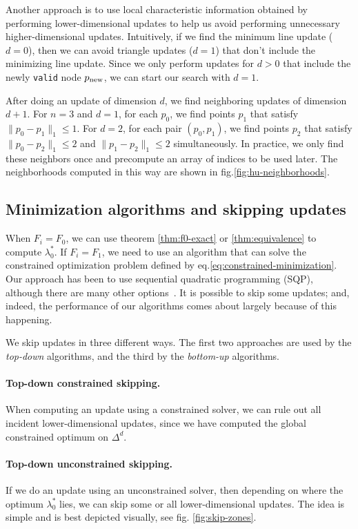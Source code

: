 \documentclass[smallcondensed]{svjour3}
\begin{document}
Another approach is to use local characteristic information obtained
by performing lower-dimensional updates to help us avoid performing
unnecessary higher-dimensional updates. Intuitively, if we find the
minimum line update ($d = 0$), then we can avoid triangle updates
($d = 1$) that don't include the minimizing line update. Since we only
perform updates for $d > 0$ that include the newly \texttt{valid} node
$p_{\operatorname{new}}$, we can start our search with $d = 1$.

After doing an update of dimension $d$, we find neighboring updates of
dimension $d + 1$. For $n = 3$ and $d = 1$, for each $p_0$, we find
points $p_1$ that satisfy $\|p_0 - p_1\|_1 \leq 1$. For $d = 2$, for
each pair $(p_0, p_1)$, we find points $p_2$ that satisfy
$\|p_0 - p_2\|_1 \leq 2$ and $\|p_1 - p_2\|_1 \leq 2$
simultaneously. In practice, we only find these neighbors once and
precompute an array of indices to be used later. The neighborhoods
computed in this way are shown in fig.\@ \ref{fig:hu-neighborhoods}.


\subsection{Minimization algorithms and skipping
  updates}\label{ssec:algorithms-and-skipping}

When $F_i = F_0$, we can use theorem \ref{thm:f0-exact} or
\ref{thm:equivalence} to compute $\lambda_0^*$. If $F_i = F_1$, we
need to use an algorithm that can solve the constrained optimization
problem defined by eq.\@ \ref{eq:constrained-minimization}. Our
approach has been to use sequential quadratic programming (SQP),
although there are many other
options~\cite{bertsekas1999nonlinear,nocedal2006numerical}. It is
possible to skip some updates; and, indeed, the performance of our
algorithms comes about largely because of this happening.

We skip updates in three different ways. The first two approaches are
used by the \emph{top-down} algorithms, and the third by the
\emph{bottom-up} algorithms.

\paragraph{Top-down constrained skipping.} When computing an update
using a constrained solver, we can rule out all incident
lower-dimensional updates, since we have computed the global
constrained optimum on $\Delta^d$.

\paragraph{Top-down unconstrained skipping.} If we do an update using
an unconstrained solver, then depending on where the optimum
$\lambda_0^*$ lies, we can skip some or all lower-dimensional
updates. The idea is simple and is best depicted visually, see fig.\@
\ref{fig:skip-zones}.
\end{document}
